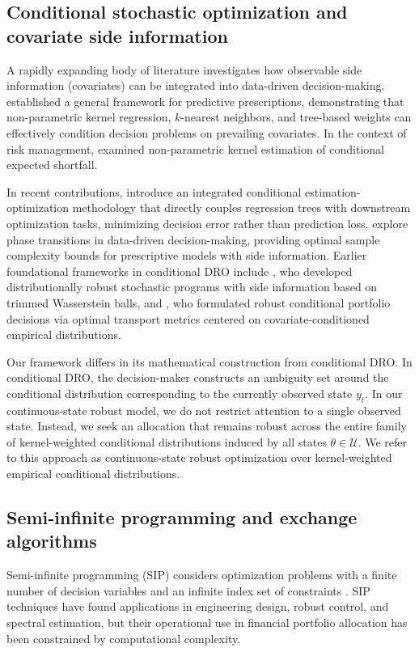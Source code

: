 \documentclass[11pt, a4paper]{article}
\begin{document}
\subsection{Conditional stochastic optimization and covariate side information}
A rapidly expanding body of literature investigates how observable side information (covariates) can be integrated into data-driven decision-making. \citet{bertsimas2020predictive} established a general framework for predictive prescriptions, demonstrating that non-parametric kernel regression, $k$-nearest neighbors, and tree-based weights can effectively condition decision problems on prevailing covariates. In the context of risk management, \citet{scaillet2004nonparametric} examined non-parametric kernel estimation of conditional expected shortfall.

In recent contributions, \citet{qi2025integrated} introduce an integrated conditional estimation-optimization methodology that directly couples regression trees with downstream optimization tasks, minimizing decision error rather than prediction loss. \citet{bennouna2025learning} explore phase transitions in data-driven decision-making, providing optimal sample complexity bounds for prescriptive models with side information. Earlier foundational frameworks in conditional DRO include \citet{esteban2022distributionally}, who developed distributionally robust stochastic programs with side information based on trimmed Wasserstein balls, and \citet{nguyen2021robustifying}, who formulated robust conditional portfolio decisions via optimal transport metrics centered on covariate-conditioned empirical distributions.

Our framework differs in its mathematical construction from conditional DRO. In conditional DRO, the decision-maker constructs an ambiguity set around the conditional distribution corresponding to the currently observed state $y_t$. In our continuous-state robust model, we do not restrict attention to a single observed state. Instead, we seek an allocation that remains robust across the entire family of kernel-weighted conditional distributions induced by all states $\theta \in \mathcal{U}$. We refer to this approach as continuous-state robust optimization over kernel-weighted empirical conditional distributions.

\subsection{Semi-infinite programming and exchange algorithms}
Semi-infinite programming (SIP) considers optimization problems with a finite number of decision variables and an infinite index set of constraints \citep{hettich1993semi, lopez2007semi}. SIP techniques have found applications in engineering design, robust control, and spectral estimation, but their operational use in financial portfolio allocation has been constrained by computational complexity.
\end{document}
